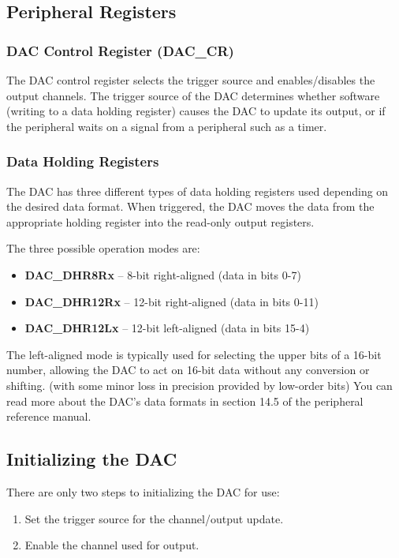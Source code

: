 \documentclass[openany,11pt,fleqn]{book} %
\begin{document}
\subsection{Peripheral Registers}

\subsubsection{DAC Control Register (DAC\_CR)}
The DAC control register selects the trigger source and enables/disables the output channels. The trigger source of the DAC determines whether software (writing to a data holding register) causes the DAC to update its output, or if the peripheral waits on a signal from a peripheral such as a timer.  

\subsubsection{Data Holding Registers}
The DAC has three different types of data holding registers used depending on the desired data format. When triggered, the DAC moves the data from the appropriate holding register into the read-only output registers. 

The three possible operation modes are:
\begin{itemize}
    \item \textbf{DAC\_DHR8Rx} -- 8-bit right-aligned (data in bits 0-7)
    \item \textbf{DAC\_DHR12Rx} -- 12-bit right-aligned (data in bits 0-11)
    \item \textbf{DAC\_DHR12Lx} -- 12-bit left-aligned (data in bits 15-4)
\end{itemize}

The left-aligned mode is typically used for selecting the upper bits of a 16-bit number, allowing the DAC to act on 16-bit data without any conversion or shifting. (with some minor loss in precision provided by low-order bits) You can read more about the DAC's data formats in section 14.5 of the peripheral reference manual.

\subsection{Initializing the DAC}
There are only two steps to initializing the DAC for use:
\begin{enumerate}
    \item Set the trigger source for the channel/output update.
    \item Enable the channel used for output. 
\end{enumerate}
\end{document}
